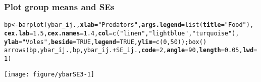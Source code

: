 \documentclass[color=usenames,dvipsnames]{beamer}\usepackage[]{graphicx}\usepackage[]{color}
\makeatletter
\newcommand{\hlnum}[1]{\textcolor[rgb]{0.69,0.494,0}{#1}}%
\newcommand{\hlstr}[1]{\textcolor[rgb]{0.749,0.012,0.012}{#1}}%
\newcommand{\hlopt}[1]{\textcolor[rgb]{0,0,0}{#1}}%
\newcommand{\hlstd}[1]{\textcolor[rgb]{0,0,0}{#1}}%
\newcommand{\hlkwb}[1]{\textcolor[rgb]{0,0.341,0.682}{#1}}%
\newcommand{\hlkwc}[1]{\textcolor[rgb]{0,0,0}{\textbf{#1}}}%
\newcommand{\hlkwd}[1]{\textcolor[rgb]{0.004,0.004,0.506}{#1}}%
\newenvironment{kframe}{%
 \def\at@end@of@kframe{}%
 \ifinner\ifhmode%
  \def\at@end@of@kframe{\end{minipage}}%
  \begin{minipage}{\columnwidth}%
 \fi\fi%
 \def\FrameCommand##1{\hskip\@totalleftmargin \hskip-\fboxsep
 \colorbox{shadecolor}{##1}\hskip-\fboxsep
     \hskip-\linewidth \hskip-\@totalleftmargin \hskip\columnwidth}%
 \MakeFramed {\advance\hsize-\width
   \@totalleftmargin\z@ \linewidth\hsize
   \@setminipage}}%
 {\par\unskip\endMakeFramed%
 \at@end@of@kframe}
\newenvironment{knitrout}{}{} %
\makeatother
\begin{document}
\begin{frame}[fragile]
  \frametitle{Plot group means and SEs}
  \tiny
\begin{knitrout}\tiny
{}\color{fgcolor}\begin{kframe}
\begin{alltt}
\hlstd{bp} \hlkwb{<-} \hlkwd{barplot}\hlstd{(ybar_ij.,} \hlkwc{xlab}\hlstd{=}\hlstr{"Predators"}\hlstd{,} \hlkwc{args.legend}\hlstd{=}\hlkwd{list}\hlstd{(}\hlkwc{title}\hlstd{=}\hlstr{"Food"}\hlstd{),}
              \hlkwc{cex.lab}\hlstd{=}\hlnum{1.5}\hlstd{,} \hlkwc{cex.names}\hlstd{=}\hlnum{1.4}\hlstd{,} \hlkwc{col}\hlstd{=}\hlkwd{c}\hlstd{(}\hlstr{"linen"}\hlstd{,} \hlstr{"lightblue"}\hlstd{,} \hlstr{"turquoise"}\hlstd{),}
              \hlkwc{ylab}\hlstd{=}\hlstr{"Voles"}\hlstd{,} \hlkwc{beside}\hlstd{=}\hlnum{TRUE}\hlstd{,} \hlkwc{legend}\hlstd{=}\hlnum{TRUE}\hlstd{,} \hlkwc{ylim}\hlstd{=}\hlkwd{c}\hlstd{(}\hlnum{0}\hlstd{,} \hlnum{50}\hlstd{));} \hlkwd{box}\hlstd{()}
\hlkwd{arrows}\hlstd{(bp, ybar_ij., bp, ybar_ij.}\hlopt{+}\hlstd{SE_ij.,} \hlkwc{code}\hlstd{=}\hlnum{2}\hlstd{,} \hlkwc{angle}\hlstd{=}\hlnum{90}\hlstd{,} \hlkwc{length}\hlstd{=}\hlnum{0.05}\hlstd{,} \hlkwc{lwd}\hlstd{=}\hlnum{1}\hlstd{)}
\end{alltt}
\end{kframe}
\end{knitrout}
\begin{center}
  \texttt{[image: figure/ybarSE3-1]}
\end{center}
\end{frame}
\end{document}
